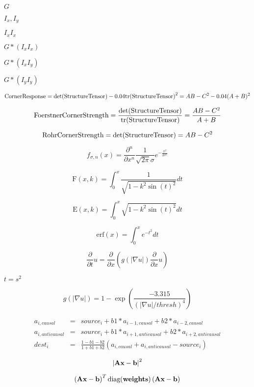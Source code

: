 \documentclass{article}
\begin{document}
$G$
\pagebreak

$I_x, I_y$
\pagebreak

$I_x I_x$
\pagebreak

$G \ast (I_x I_x)$
\pagebreak

$G \ast (I_x I_y)$
\pagebreak

$G \ast (I_y I_y)$
\pagebreak

\[ \mbox{\rm CornerResponse} = \mbox{\rm det(StructureTensor)} - 0.04 \mbox{\rm tr(StructureTensor)}^2 = A B - C^2 - 0.04 (A + B)^2 \]
\pagebreak

\[ \mbox{\rm FoerstnerCornerStrength} = \frac{\mbox{\rm det(StructureTensor)}}{\mbox{\rm tr(StructureTensor)}} = \frac{A B - C^2}{A + B} \]
\pagebreak

\[ \mbox{\rm RohrCornerStrength} = \mbox{\rm det(StructureTensor)} = A B - C^2 \]
\pagebreak

\[ f_{\sigma,n}(x)=\frac{\partial^n}{\partial x^n} \frac{1}{\sqrt{2\pi}\sigma}e^{-\frac{x^2}{2\sigma^2}} \]
\pagebreak

\[ \mbox{F}(x, k) = \int_0^x \frac{1}{\sqrt{1 - k^2 \sin(t)^2}} dt \]
\pagebreak

\[ \mbox{E}(x, k) = \int_0^x \sqrt{1 - k^2 \sin(t)^2} dt \]
\pagebreak

\[ \mbox{erf}(x) = \int_0^x e^{-t^2} dt \]
\pagebreak

\[ \frac{\partial}{\partial t} u = \frac{\partial}{\partial x} \left( g(|\nabla u|) \frac{\partial}{\partial x} u \right) \]
\pagebreak

$t = s^2$
\pagebreak

\[ g(|\nabla u|) = 1 - \exp{\left(\frac{-3.315}{(|\nabla u| / thresh)^4}\right)} \]
\pagebreak

\[ \begin{array}{rcl} a_{i, causal} & = & source_i + b1 * a_{i-1, causal} + b2 * a_{i-2, causal} \\ a_{i, anticausal} & = & source_i + b1 * a_{i+1, anticausal} + b2 * a_{i+2, anticausal} \\ dest_i & = & \frac{1 - b1 - b2}{1 + b1 + b2}(a_{i, causal} + a_{i, anticausal} - source_i) \end{array} \]
\pagebreak

\[ \left|\textrm{\bf A} \textrm{\bf x} - \textrm{\bf b}\right|^2 \]
\pagebreak

\[ \left(\textrm{\bf A} \textrm{\bf x} - \textrm{\bf b}\right)^T \textrm{diag}(\textrm{\bf weights}) \left(\textrm{\bf A} \textrm{\bf x} - \textrm{\bf b}\right) \]
\pagebreak
\end{document}
